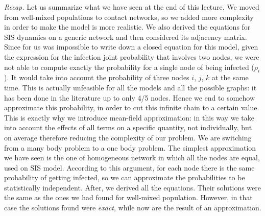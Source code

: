 \documentclass[../main/main.tex]{subfiles}
\begin{document}
\textit{Recap.} 
Let us summarize what we have seen at the end of this lecture.
We moved from well-mixed populations to contact networks, so we added more complexity in order to make the model is more realistic. We also derived the equations for SIS dynamics on a generic network and then considered its adjacency matrix. Since for us was impossible to write down a closed equation for this model, given the expression for the infection joint probability that involves two nodes, we were not able to compute exactly the probability for a single node of being infected ($\rho_i$). It would take into account the probability of three nodes $i$, $j$, $k$ at the same time. This is actually unfeasible for all the models and all the possible graphs: it has been done in the literature up to only 4/5 nodes. Hence we end to somehow approximate this probability, in order to cut this infinite chain to a certain value. This is exactly why we introduce mean-field approximation: in this way we take into account the effects of all terms on a specific quantity, not individually, but on average therefore reducing the complexity of our problem. We are switching from a many body problem to a one body problem.
The simplest approximation we have seen is the one of homogeneous network in which all the nodes are equal, used on SIS model. According to this argument, for each node there is the same probability of getting infected, so we can approximate the probabilities to be statistically independent. After, we derived all the equations. Their solutions were the same as the ones we had found for well-mixed population. However, in that case the solutions found were \textit{exact}, while now are the result of an approximation.
\end{document}
